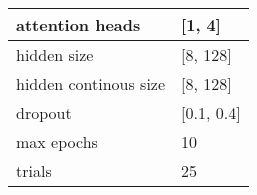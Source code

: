 \begin{tabular}{|p{4cm}|p{2cm}|}
    \hline
    attention heads & [1, 4] \\ \hline
    hidden size & [8, 128] \\ \hline
    hidden continous size & [8, 128] \\ \hline
    dropout & [0.1, 0.4] \\ \hline
    max epochs & 10 \\ \hline
    trials & 25 \\ \hline
\end{tabular}
